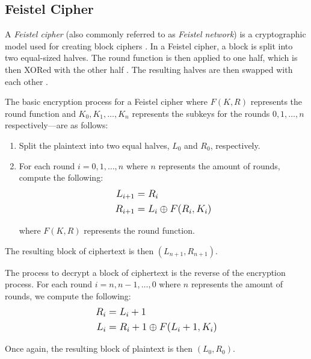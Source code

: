 \subsection{Feistel Cipher}

A \textit{Feistel cipher} (also commonly referred to as \textit{Feistel network}) is a cryptographic model used for creating block ciphers \cite{wiki:feistel_cipher}.
In a Feistel cipher, a block is split into two equal-sized halves. The round function is then applied to one half, which is then XORed with the other half \cite{wiki:feistel_cipher}. 
The resulting halves are then swapped with each other \cite{wiki:feistel_cipher}.

The basic encryption process for a Feistel cipher where $F(K, R)$ represents the round function and $K_0,K_1,\ldots,K_n$ represents the subkeys for the rounds 
$0,1,\ldots,n$ respectively---are as follows:

\begin{enumerate}
    \item Split the plaintext into two equal halves, $L_0$ and $R_0$, respectively.
    \item For each round $i = 0,1,\ldots,n$ where $n$ represents the amount of rounds, compute the following: 
        \begin{align*}
            \mathlarger{L_{i + 1}\;} & \mathlarger{= R_i} \\
            \mathlarger{R_{i + 1}\;} & \mathlarger{= L_i \oplus F(R_i,K_i)}
        \end{align*}
            
        where $F(K,R)$ represents the round function.
\end{enumerate}

The resulting block of ciphertext is then $(L_{n + 1},R_{n + 1})$.

The process to decrypt a block of ciphertext is the reverse of the encryption process. For each round $i = n,n-1,\ldots,0$ where $n$ represents the amount of rounds, 
we compute the following:
\begin{align*}
    \mathlarger{R_{i}\;} & \mathlarger{= L_i+1} \\
    \mathlarger{L_{i}\;} & \mathlarger{= R_i+1 \oplus F(L_i+1,K_i)}
\end{align*}

Once again, the resulting block of plaintext is then $(L_0,R_0)$.

